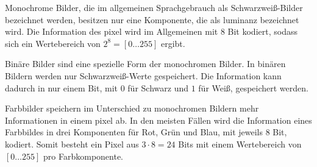 Monochrome Bilder, die im allgemeinen Sprachgebrauch als Schwarzweiß-Bilder bezeichnet werden, besitzen nur eine
 Komponente, die als \gls{luminanz} bezeichnet wird. Die Information des \gls{pixel} wird im Allgemeinen
 mit 8 Bit kodiert, sodass sich ein Wertebereich von $2^8 = \left[0\dotsc255\right]$ ergibt.

Binäre Bilder sind eine spezielle Form der monochromen Bilder. In binären Bildern werden nur Schwarzweiß-Werte
 gespeichert. Die Information kann dadurch in nur einem Bit, mit $0$ für Schwarz und $1$ für Weiß, gespeichert werden.

Farbbilder speichern im Unterschied zu monochromen Bildern mehr Informationen in einem \gls{pixel} ab. In den meisten
 Fällen wird die Information eines Farbbildes in drei Komponenten für Rot, Grün und Blau, mit jeweils 8 Bit, kodiert.
 Somit besteht ein Pixel aus \(3 \cdot 8 = 24\) Bits mit einem Wertebereich von \(\left[0 \dotsc 255\right]\) pro
 Farbkomponente.


